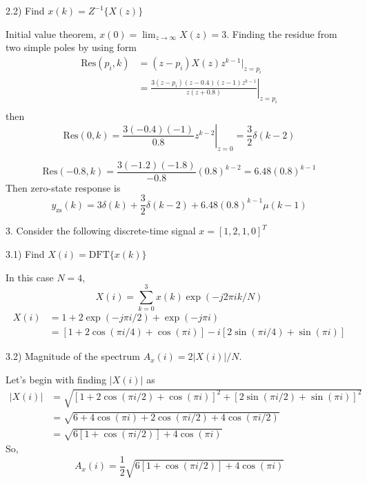\documentclass[12pt]{article}
\begin{document}
2.2) Find $x(k)=Z^{-1}\{X(z)\}$

Initial value theorem, $x(0)=\lim_{z\rightarrow\infty}X(z)=3$.
Finding the residue from two simple poles by using form
\begin{equation*}
\begin{split}
    \text{Res}(p_i, k) &= (z-p_i)X(z)z^{k-1}|_{z=p_i} \\
    &= \left.\frac{3(z-p_i)(z-0.4)(z-1)z^{k-1}}{z(z+0.8)}\right|_{z=p_i} \\
\end{split}
\end{equation*}
then
\begin{equation*}
    \text{Res}(0, k) = \left.\frac{3(-0.4)(-1)}{0.8}z^{k-2}\right|_{z=0} = \frac{3}{2}\delta(k-2)
\end{equation*}

\begin{equation*}
    \text{Res}(-0.8, k) = \frac{3(-1.2)(-1.8)}{-0.8}(0.8)^{k-2} = 6.48(0.8)^{k-1}
\end{equation*}
Then zero-state response is
\begin{equation*}
    y_\text{zs}(k) = 3\delta(k) + \frac{3}{2}\delta(k-2) + 6.48(0.8)^{k-1}\mu(k-1)
\end{equation*}


\vspace{20pt}
3. Consider the following discrete-time signal $x = [1,2,1,0]^T$

3.1) Find $X(i) = \text{DFT}\{x(k)\}$

In this case $N=4$, 
\begin{equation*}
    X(i) = \sum_{k=0}^3 x(k)\exp(-j2\pi ik/N)
\end{equation*}
\begin{equation*}
\begin{split}
    X(i) &= 1 + 2\exp(-j\pi i/2) + \exp(-j\pi i) \\
    &= [1+2\cos(\pi i/4) + \cos(\pi i)] - i [2\sin(\pi i/4) + \sin(\pi i)]
\end{split}
\end{equation*}

3.2) Magnitude of the spectrum $A_x(i) = 2|X(i)|/N$.

Let's begin with finding $|X(i)|$ as
\begin{equation*}
\begin{split}
    |X(i)| &= \sqrt{[1+2\cos(\pi i/2)+\cos(\pi i)]^2 + [2\sin(\pi i/2) + \sin(\pi i)]^2} \\
    &= \sqrt{6 + 4\cos(\pi i) + 2\cos(\pi i/2) + 4\cos(\pi i/2)} \\
    &= \sqrt{6[1+\cos(\pi i/2)] + 4\cos(\pi i)}
\end{split}
\end{equation*}
So,
\begin{equation*}
    A_x(i) = \frac{1}{2}\sqrt{6[1+\cos(\pi i/2)] + 4\cos(\pi i)}
\end{equation*}
\end{document}

